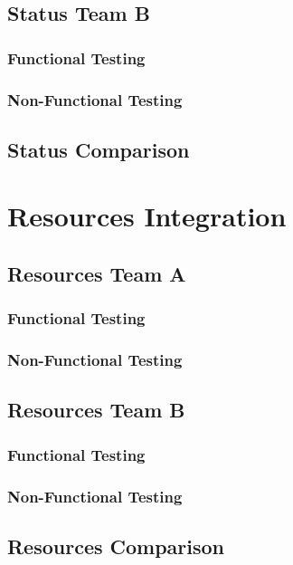 \documentclass[12pt, oneside]{article}
\begin{document}
	\subsection{Status Team B}	
		\subsubsection{Functional Testing}
			
		\subsubsection{Non-Functional Testing }
			
	
	\subsection{Status Comparison}
\newpage 
\section{Resources Integration}
	\subsection{Resources Team A}	
		\subsubsection{Functional Testing}
			
		\subsubsection{Non-Functional Testing }
			
	
	\subsection{Resources Team B}	
		\subsubsection{Functional Testing}
			
		\subsubsection{Non-Functional Testing }
			
			
	
	\subsection{Resources Comparison}
	
\end{document}
